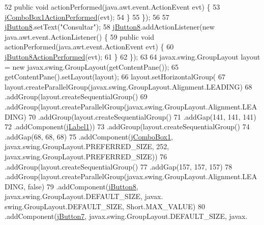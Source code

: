 \begin{DoxyCode}
52             \textcolor{keyword}{public} \textcolor{keywordtype}{void} actionPerformed(java.awt.event.ActionEvent evt) \{
53                 \mbox{\hyperlink{class_interfaz_package_1_1_interfaz_consulta_a72feab888bad4cca4bf15c1186d400a1}{jComboBox1ActionPerformed}}(evt);
54             \}
55         \});
56 
57         \mbox{\hyperlink{class_interfaz_package_1_1_interfaz_consulta_a82083645edf763690351c2f33263a8a1}{jButton8}}.setText(\textcolor{stringliteral}{"Consultar"});
58         \mbox{\hyperlink{class_interfaz_package_1_1_interfaz_consulta_a82083645edf763690351c2f33263a8a1}{jButton8}}.addActionListener(\textcolor{keyword}{new} java.awt.event.ActionListener() \{
59             \textcolor{keyword}{public} \textcolor{keywordtype}{void} actionPerformed(java.awt.event.ActionEvent evt) \{
60                 \mbox{\hyperlink{class_interfaz_package_1_1_interfaz_consulta_a71dca5baea9a79d982001c3407d35e79}{jButton8ActionPerformed}}(evt);
61             \}
62         \});
63 
64         javax.swing.GroupLayout layout = \textcolor{keyword}{new} javax.swing.GroupLayout(getContentPane());
65         getContentPane().setLayout(layout);
66         layout.setHorizontalGroup(
67             layout.createParallelGroup(javax.swing.GroupLayout.Alignment.LEADING)
68             .addGroup(layout.createSequentialGroup()
69                 .addGroup(layout.createParallelGroup(javax.swing.GroupLayout.Alignment.LEADING)
70                     .addGroup(layout.createSequentialGroup()
71                         .addGap(141, 141, 141)
72                         .addComponent(\mbox{\hyperlink{class_interfaz_package_1_1_interfaz_consulta_aeeb159dc49a945f8285bc200316b7b38}{jLabel1}}))
73                     .addGroup(layout.createSequentialGroup()
74                         .addGap(68, 68, 68)
75                         .addComponent(\mbox{\hyperlink{class_interfaz_package_1_1_interfaz_consulta_adc5bff154b6dcb8682ea4727b7783ee5}{jComboBox1}}, javax.swing.GroupLayout.PREFERRED\_SIZE, 252, 
      javax.swing.GroupLayout.PREFERRED\_SIZE))
76                     .addGroup(layout.createSequentialGroup()
77                         .addGap(157, 157, 157)
78                         .addGroup(layout.createParallelGroup(javax.swing.GroupLayout.Alignment.LEADING, \textcolor{keyword}{
      false})
79                             .addComponent(\mbox{\hyperlink{class_interfaz_package_1_1_interfaz_consulta_a82083645edf763690351c2f33263a8a1}{jButton8}}, javax.swing.GroupLayout.DEFAULT\_SIZE, javax.
      swing.GroupLayout.DEFAULT\_SIZE, Short.MAX\_VALUE)
80                             .addComponent(\mbox{\hyperlink{class_interfaz_package_1_1_interfaz_consulta_afd5c627098a6c6bb116f8120486ba5bd}{jButton7}}, javax.swing.GroupLayout.DEFAULT\_SIZE, javax.

\end{DoxyCode}
